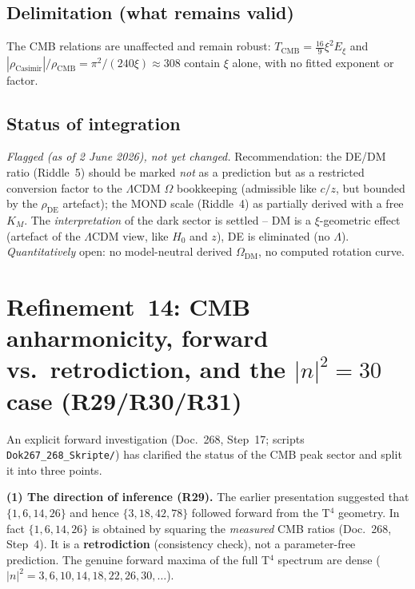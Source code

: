 \subsection*{Delimitation (what remains valid)}

The CMB relations are unaffected and remain robust:
$T_{\text{CMB}} = \tfrac{16}{9}\xi^2 E_\xi$ and
$|\rho_{\text{Casimir}}|/\rho_{\text{CMB}} = \pi^2/(240\xi) \approx 308$
contain $\xi$ alone, with no fitted exponent or factor.

\subsection*{Status of integration}

\emph{Flagged (as of 2 June 2026), not yet changed.} Recommendation: the DE/DM
ratio (Riddle~5) should be marked \emph{not} as a prediction but as a restricted
conversion factor to the $\Lambda$CDM $\Omega$ bookkeeping (admissible like
$c/z$, but bounded by the $\rho_{\text{DE}}$ artefact); the MOND scale
(Riddle~4) as partially derived with a free $K_M$. The \emph{interpretation} of
the dark sector is settled -- DM is a $\xi$-geometric effect (artefact of the
$\Lambda$CDM view, like $H_0$ and $z$), DE is eliminated (no $\Lambda$).
\emph{Quantitatively} open: no model-neutral derived $\Omega_{\text{DM}}$, no
computed rotation curve.

\section{Refinement~14: CMB anharmonicity, forward vs.\ retrodiction, and the $|n|^2=30$ case (R29/R30/R31)}

An explicit forward investigation (Doc.~268, Step~17; scripts
\texttt{Dok267\_268\_Skripte/}) has clarified the status of the CMB peak sector
and split it into three points.

\textbf{(1) The direction of inference (R29).}
The earlier presentation suggested that $\{1,6,14,26\}$ and hence
$\{3,18,42,78\}$ followed forward from the T$^4$ geometry. In fact
$\{1,6,14,26\}$ is obtained by squaring the \emph{measured} CMB ratios
(Doc.~268, Step~4). It is a \textbf{retrodiction} (consistency check), not a
parameter-free prediction. The genuine forward maxima of the full T$^4$
spectrum are dense ($|n|^2=3,6,10,14,18,22,26,30,\ldots$).

